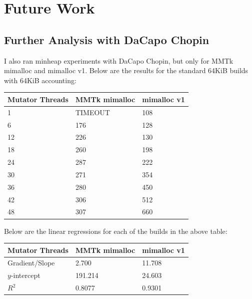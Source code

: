 \documentclass{article}
\begin{document}
\section{Future Work}
\subsection{Further Analysis with DaCapo Chopin}
I also ran minheap experiments with DaCapo Chopin, but only for MMTk mimalloc and mimalloc v1. Below are the results for the standard 64KiB builds with 64KiB accounting:
\begin{center}
    \begin{tabular}{|l|l|l|}
        \hline
        Mutator Threads & MMTk mimalloc & mimalloc v1\\
        \hline
        1 & TIMEOUT & 108\\
        \hline
        6 & 176 & 128\\
        \hline
        12 & 226 & 130\\
        \hline
        18 & 260 & 198\\
        \hline
        24 & 287 & 222\\
        \hline
        30 & 271 & 354\\
        \hline
        36 & 280 & 450\\
        \hline
        42 & 306 & 512\\
        \hline
        48 & 307 & 660\\
        \hline
    \end{tabular}
\end{center}

Below are the linear regressions for each of the builds in the above table:
\begin{center}
    \begin{tabular}{|l|l|l|}
        \hline
        Mutator Threads & MMTk mimalloc & mimalloc v1\\
        \hline
        Gradient/Slope & 2.700 & 11.708\\
        \hline
        $y$-intercept & 191.214 & 24.603\\
        \hline
        $R^2$ & 0.8077 & 0.9301\\
        \hline
    \end{tabular}
\end{center}
\end{document}
